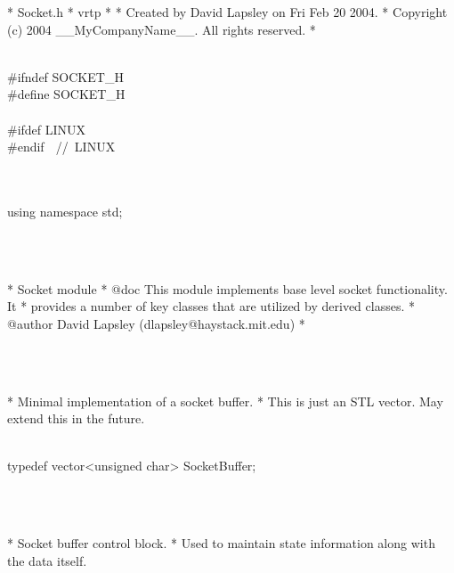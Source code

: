 \documentclass{article}
\begin{document}
 *  Socket.h
 *  vrtp
 *
 *  Created by David Lapsley on Fri Feb 20 2004.
 *  Copyright (c) 2004 __MyCompanyName__. All rights reserved.
 *
 \strut\goodbreak
{}\strut\nopagebreak\\
 #ifndef SOCKET_H
\\
 #define SOCKET_H
\\
 
\\
 #ifdef LINUX
\\
 #endif 
\hbox{// LINUX}\strut\\
 
\\
 using namespace std;
\strut\\\strut\\* Socket module
  * @doc This module implements base level socket functionality. It
  * provides a number of key classes that are utilized by derived classes.
  * @author David Lapsley (dlapsley@haystack.mit.edu)
  * 
  \strut\\\strut\\* Minimal implementation of a socket buffer. 
  * This is just an STL vector. May extend this in the future.	
  \strut\goodbreak
{}\strut\nopagebreak\\
 typedef vector<unsigned char> SocketBuffer;
\strut\\\strut\\* Socket buffer control block.
  * Used to maintain state information along with the data itself.
  \strut\goodbreak
{}\strut\nopagebreak\\
\end{document}

